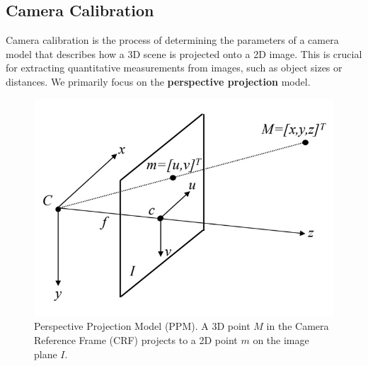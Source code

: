 \documentclass{article}
\begin{document}





\subsection{Camera Calibration}

Camera calibration is the process of determining the parameters of a camera model that describes how a 3D scene is projected onto a 2D image. This is crucial for extracting quantitative measurements from images, such as object sizes or distances. We primarily focus on the \textbf{perspective projection} model.

\begin{figure}[htbp]
  \centering
  \includegraphics[width=0.5\linewidth]{./img/camera_calibration.jpg}
  \caption{Perspective Projection Model (PPM). A 3D point $M$ in the Camera Reference Frame (CRF) projects to a 2D point $m$ on the image plane $I$.}
\end{figure}
\end{document}
